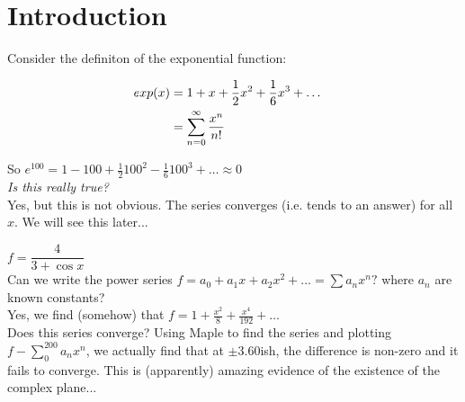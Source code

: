 \setcounter{lecture}{1}
\pagebreak
\section{Introduction}



\begin{example}
Consider the definiton of the exponential function: \vspace{-10pt}

\begin{align} \nonumber
exp(x) &= 1 + x + \frac{1}{2}x^2 + \frac{1}{6}x^3 + \dots && \vspace*{5pt}\\\nonumber
&= \sum_{n=0}^{\infty} \frac{x^n}{n!} &&
\end{align}

So $e^{100} = 1 - 100 + \frac{1}{2}100^2 - \frac{1}{6}100^3 + \dots \approx 0$\\

\textit{Is this really true?}\\
Yes, but this is not obvious. The series converges (i.e. tends to an answer) for all $x$. We will see this later...\\
\end{example}

\begin{example}
$f = \dfrac{4}{3+\cos x}$\\

Can we write the power series $f = a_0 + a_1 x + a_2 x^2 + \dots = \sum a_n x^n?$ where $a_n$ are known constants?\\

Yes, we find (somehow) that $f = 1 + \frac{x^2}{8} + \frac{x^4}{192} + \dots$\\

Does this series converge? Using Maple to find the series and plotting $f - \sum_0^{200} a_n x^n$, we actually find that at $\pm 3.60$ish, the difference is non-zero and it fails to converge. This is (apparently) amazing evidence of the existence of the complex plane...\\

\end{example}

